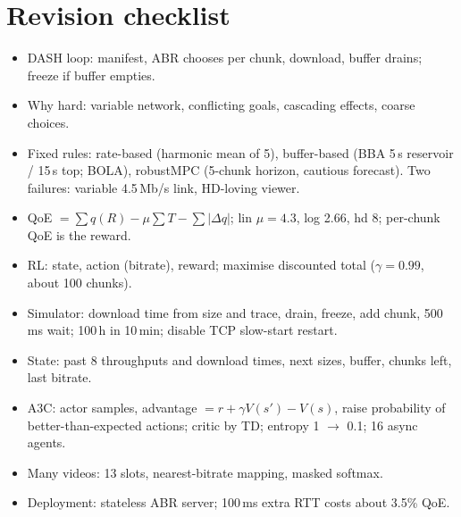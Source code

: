 \section{Revision checklist}
\begin{itemize}
  \item DASH loop: manifest, ABR chooses per chunk, download, buffer drains; freeze if buffer empties.
  \item Why hard: variable network, conflicting goals, cascading effects, coarse choices.
  \item Fixed rules: rate-based (harmonic mean of 5), buffer-based (BBA 5\,s reservoir / 15\,s top; BOLA), robustMPC (5-chunk horizon, cautious forecast).
        Two failures: variable 4.5\,Mb/s link, HD-loving viewer.
  \item QoE $= \sum q(R) - \mu \sum T - \sum |\Delta q|$; lin $\mu = 4.3$, log 2.66, hd 8; per-chunk QoE is the reward.
  \item RL: state, action (bitrate), reward; maximise discounted total ($\gamma = 0.99$, about 100 chunks).
  \item Simulator: download time from size and trace, drain, freeze, add chunk, 500\,ms wait; 100\,h in 10\,min; disable TCP slow-start restart.
  \item State: past 8 throughputs and download times, next sizes, buffer, chunks left, last bitrate.
  \item A3C: actor samples, advantage $= r + \gamma V(s') - V(s)$, raise probability of better-than-expected actions; critic by TD; entropy 1 $\to$ 0.1; 16 async agents.
  \item Many videos: 13 slots, nearest-bitrate mapping, masked softmax.
  \item Deployment: stateless ABR server; 100\,ms extra RTT costs about 3.5\% QoE.
\end{itemize}
